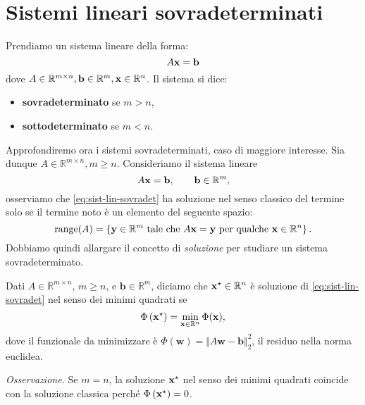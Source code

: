 \section{Sistemi lineari sovradeterminati}

Prendiamo un sistema lineare della forma:
\begin{equation*}
A\mathbf{x} =\mathbf{b}
\end{equation*}
dove $A\in \mathbb{R}^{m\times n} ,\mathbf{b} \in \mathbb{R}^{m} ,\mathbf{x} \in \mathbb{R}^{n}$. Il sistema si dice:
\begin{itemize}
\item \textbf{sovradeterminato} se $m >n$,
\item \textbf{sottodeterminato} se $m< n$.
\end{itemize}
Approfondiremo ora i sistemi sovradeterminati, caso di maggiore interesse.
Sia dunque $A\in \mathbb{R}^{m\times n} ,m\geqslant n$.
Consideriamo il sistema lineare
\begin{equation}
A\mathbf{x} =\mathbf{b} ,\qquad\mathbf{b} \in \mathbb{R}^{m},
\label{eq:sist-lin-sovradet}
\end{equation}
osserviamo che \eqref{eq:sist-lin-sovradet} ha soluzione nel senso classico del termine solo se il termine noto è un elemento del seguente spazio:
\begin{equation*}
\operatorname{range}(A) =\left\{\mathbf{y} \in \mathbb{R}^{m} \ \text{tale che} \ A\mathbf{x} =\mathbf{y} \ \text{per qualche} \ \mathbf{x} \in \mathbb{R}^{n}\right\}.
\end{equation*}
Dobbiamo quindi allargare il concetto di \textit{soluzione} per studiare un sistema sovradeterminato.
\begin{definition}
Dati $A\in \mathbb{R}^{m\times n}$, $m\geqslant n$, e $\mathbf{b} \in \mathbb{R}^{m}$, diciamo che $\mathbf{x}^{\star } \in \mathbb{R}^{n}$ è soluzione di \eqref{eq:sist-lin-sovradet} nel senso dei minimi quadrati se
\begin{equation*}
\Phi \left(\mathbf{x}^{\star }\right) =\min_{\mathbf{x} \in \mathbb{R}^{n}} \Phi (\mathbf{x}),
\end{equation*}
dove il funzionale da minimizzare è $\Phi (\mathbf{w}) =\Vert A\mathbf{w} -\mathbf{b}\Vert ^{2}_{2}$, il residuo nella norma euclidea.
\end{definition}
\textit{Osservazione.} Se $m=n$, la soluzione $\mathbf{x}^{\star }$ nel senso dei minimi quadrati coincide con la soluzione classica perché $\Phi \left(\mathbf{x}^{\star }\right) =0$.

